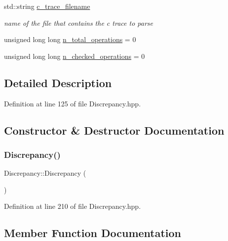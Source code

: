\begin{DoxyCompactItemize}
std\+::string \hyperlink{structDiscrepancy_a9a9f2847e0060eaf86f97162ee66d865}{c\+\_\+trace\+\_\+filename}
\begin{DoxyCompactList}\small\item\em name of the file that contains the c trace to parse \end{DoxyCompactList}\item 
unsigned long long \hyperlink{structDiscrepancy_aeb8b28098a68db7393b30d939f6702c2}{n\+\_\+total\+\_\+operations} = 0
\item 
unsigned long long \hyperlink{structDiscrepancy_a6f30a7f808cbb365f0013d805cda2c3e}{n\+\_\+checked\+\_\+operations} = 0
\end{DoxyCompactItemize}


\subsection{Detailed Description}


Definition at line 125 of file Discrepancy.\+hpp.



\subsection{Constructor \& Destructor Documentation}
\mbox{\label{structDiscrepancy_a2b4af9043dce1074c182a0c4f8661e53}} 
\subsubsection{\texorpdfstring{Discrepancy()}{Discrepancy()}}
{\footnotesize\ttfamily Discrepancy\+::\+Discrepancy (\begin{DoxyParamCaption}{ }\end{DoxyParamCaption})\hspace{0.3cm}{\ttfamily [inline]}}



Definition at line 210 of file Discrepancy.\+hpp.



\subsection{Member Function Documentation}
\mbox{\label{structDiscrepancy_aef5d866bbdca6c194b1513f5fdd22efc}} 
